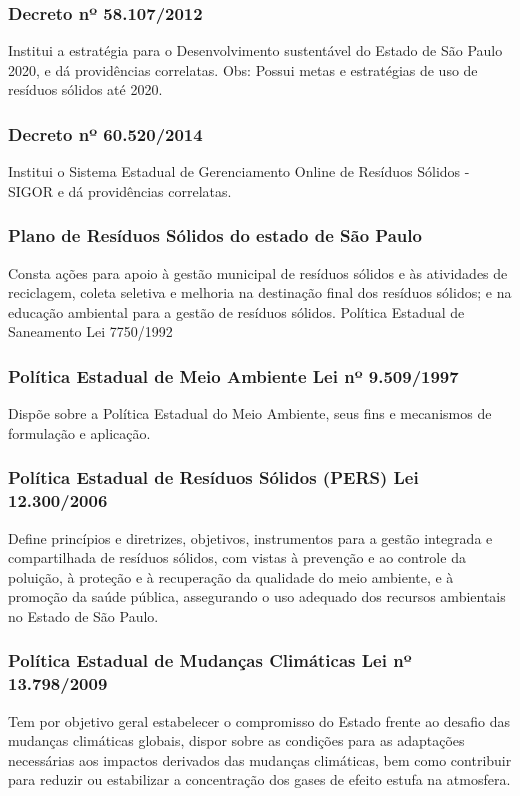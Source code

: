 \begin{subapend}
\begin{subsubapend}
		\subsubsection{Decreto nº 58.107/2012}
		Institui a estratégia para o Desenvolvimento sustentável do Estado de São Paulo 2020, e dá providências correlatas. Obs: Possui metas e estratégias de uso de resíduos sólidos até 2020.
		\subsubsection{Decreto nº 60.520/2014}
		Institui o Sistema Estadual de Gerenciamento Online de Resíduos Sólidos - SIGOR e dá providências correlatas.
		\subsubsection{Plano de Resíduos Sólidos do estado de São Paulo}
		Consta ações para apoio à gestão municipal de resíduos sólidos e às atividades de reciclagem, coleta seletiva e melhoria na destinação final dos resíduos sólidos; e na educação ambiental para a gestão de resíduos sólidos. Política Estadual de Saneamento Lei 7750/1992
		\subsubsection{Política Estadual de Meio Ambiente Lei nº 9.509/1997}
		Dispõe sobre a Política Estadual do Meio Ambiente, seus fins e mecanismos de formulação e aplicação.
		\subsubsection{Política Estadual de Resíduos Sólidos (PERS) Lei 12.300/2006}
		Define princípios e diretrizes, objetivos, instrumentos para a gestão integrada e compartilhada de resíduos sólidos, com vistas à prevenção e ao controle da poluição, à proteção e à recuperação da qualidade do meio ambiente, e à promoção da saúde pública, assegurando o uso adequado dos recursos ambientais no Estado de São Paulo.
		\subsubsection{Política Estadual de Mudanças Climáticas Lei nº 13.798/2009}
		Tem por objetivo geral estabelecer o compromisso do Estado frente ao desafio das mudanças climáticas globais, dispor sobre as condições para as adaptações necessárias aos impactos derivados das mudanças climáticas, bem como contribuir para reduzir ou estabilizar a concentração dos gases de efeito estufa na atmosfera.

\end{subsubapend}
\end{subapend}
